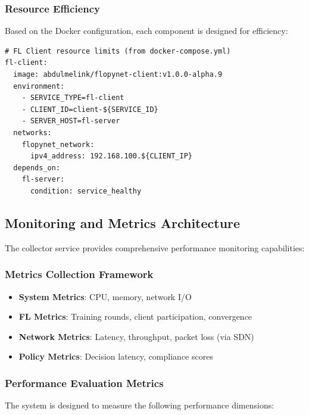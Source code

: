 \subsubsection{Resource Efficiency}
Based on the Docker configuration, each component is designed for efficiency:

\begin{lstlisting}[style=dockercode, caption=Resource-Aware Container Configuration]
# FL Client resource limits (from docker-compose.yml)
fl-client:
  image: abdulmelink/flopynet-client:v1.0.0-alpha.9
  environment:
    - SERVICE_TYPE=fl-client
    - CLIENT_ID=client-${SERVICE_ID}
    - SERVER_HOST=fl-server
  networks:
    flopynet_network:
      ipv4_address: 192.168.100.${CLIENT_IP}
  depends_on:
    fl-server:
      condition: service_healthy
\end{lstlisting}

\subsection{Monitoring and Metrics Architecture}

The collector service provides comprehensive performance monitoring capabilities:

\subsubsection{Metrics Collection Framework}
\begin{itemize}
    \item \textbf{System Metrics}: CPU, memory, network I/O
    \item \textbf{FL Metrics}: Training rounds, client participation, convergence
    \item \textbf{Network Metrics}: Latency, throughput, packet loss (via SDN)
    \item \textbf{Policy Metrics}: Decision latency, compliance scores
\end{itemize}

\subsubsection{Performance Evaluation Metrics}

The system is designed to measure the following performance dimensions:

